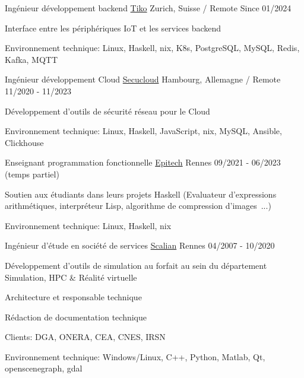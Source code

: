 \begin{cventries}
  \cventry
    {Ingénieur développement backend}
    {\href{https://www.linkedin.com/company/secucloud/}{Tiko}}
    {Zurich, Suisse / Remote}
    {Since 01/2024}
    {
      \begin{cvitems}
        \item {Interface entre les périphériques IoT et les services backend}
        \item {Environnement technique: Linux, Haskell, nix, K8s, PostgreSQL, 
            MySQL, Redis, Kafka, MQTT}
      \end{cvitems}
    }

  \cventry
    {Ingénieur développement Cloud}
    {\href{https://www.linkedin.com/company/secucloud/}{Secucloud}}
    {Hambourg, Allemagne / Remote}
    {11/2020 - 11/2023}
    {
      \begin{cvitems}
        \item {Développement d'outils de sécurité réseau pour le Cloud}
        \item {Environnement technique: Linux, Haskell, JavaScript, nix,
            MySQL, Ansible, Clickhouse}
      \end{cvitems}
    }

  \cventry
    {Enseignant programmation fonctionnelle}
    {\href{https://www.epitech.eu/}{Epitech}}
    {Rennes}
    {09/2021 - 06/2023 (temps partiel)}
    {
      \begin{cvitems}
          \item {Soutien aux étudiants dans leurs projets Haskell (Evaluateur
              d'expressions arithmétiques, interpréteur Lisp, algorithme de
              compression d'images~...)}
          \item {Environnement technique: Linux, Haskell, nix}
      \end{cvitems}
    }

  \cventry
    {Ingénieur d'étude en société de services}
    {\href{https://www.scalian.com/}{Scalian}}
    {Rennes}
    {04/2007 - 10/2020}
    {
      \begin{cvitems}
        \item {Développement d'outils de simulation au forfait au sein du
            département Simulation, HPC \& Réalité virtuelle}
        \item {Architecture et responsable technique}
        \item {Rédaction de documentation technique}
        \item {Clients: DGA, ONERA, CEA, CNES, IRSN}
        \item {Environnement technique: Windows/Linux, C++, Python, Matlab, Qt,
            openscenegraph, gdal}
      \end{cvitems}
    }


\end{cventries}
